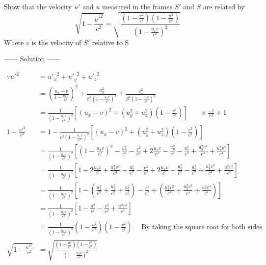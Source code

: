 \begin{example}
    Show that the velocity $u'$ and $u$ measured in the frames $S'$ and $S$ are related by 
\[
\sqrt{1-\frac{{u'}^2}{c^2}} = \sqrt{\frac{\left(1-\frac{v^2}{c^2}\right)\left(1-\frac{u^2}{c^2}\right)}{{\left(1-\frac{u_x v}{c^2}\right)}^2}}
\]
Where $v$ is the velocity of $S'$ relative to S
\begin{center}
    ------ \textcolor{Solution}{Solution} ------
\end{center}
\begin{align*}
    \because {u'}^2         &= {u'_x}^2+{u'_y}^2+{u'_z}^2\\
                            &= {\left(\frac{u_x -v}{1-\frac{u_x v}{c^2}}\right)}^2 + \frac{u_y^2}{\beta^2{\left(1-\frac{u_x v}{c^2}\right)}^2} + \frac{u_z^2}{\beta^2{\left(1-\frac{u_x v}{c^2}\right)}^2}\\
                            &= \frac{1}{{\left(1-\frac{u_x v}{c^2}\right)}^2} \left[ {(u_x - v)}^2 + \left(u_y^2 + u_z^2\right)\left(1-\frac{v^2}{c^2}\right)  \right] \ \ \ \ \ \ \ \ \times\frac{-1}{c^2} + 1\\
1-\frac{{u'}^2}{c^2}        &= 1 - \frac{1}{c^2{\left(1-\frac{u_x v}{c^2}\right)}^2} \left[ {(u_x - v)}^2 + \left(u_y^2 + u_z^2\right)\left(1-\frac{v^2}{c^2}\right)  \right]\\
                            &= \frac{1}{{\left(1-\frac{u_x v}{c^2}\right)}^2} \left[ {\left(1-\frac{u_x v}{c^2}\right)}^2 - \frac{u_x^2}{c^2} - \frac{v^2}{c^2} + 2\frac{u_x v}{c^2} - \frac{u_y^2}{c^2} - \frac{u_z^2}{c^2} + \frac{u_y^2 v^2}{c^4} + \frac{u_z^2 v^2}{c^4}\right]\\
                            &= \frac{1}{{\left(1-\frac{u_x v}{c^2}\right)}^2} \left[ 1 -2\frac{u_x v}{c^2} + \frac{u_x^2 v^2}{c^4} - \frac{u_x^2}{c^2} - \frac{v^2}{c^2} + 2\frac{u_x v}{c^2} - \frac{u_y^2}{c^2} - \frac{u_z^2}{c^2} + \frac{u_y^2 v^2}{c^4} + \frac{u_z^2 v^2}{c^4}\right]\\
                            &= \frac{1}{{\left(1-\frac{u_x v}{c^2}\right)}^2} \left[ 1 -\left(\frac{u_x^2}{c^2} + \frac{u_y^2}{c^2} + \frac{u_z^2}{c^2}\right) - \frac{v^2}{c^2} +\left(\frac{u_x^2 v^2}{c^4} + \frac{u_y^2 v^2}{c^4} + \frac{u_z^2 v^2}{c^4}\right)\right]\\
                            &= \frac{1}{{\left(1-\frac{u_x v}{c^2}\right)}^2} \left[ 1 -\frac{u^2}{c^2} - \frac{v^2}{c^2} +\frac{u^2 v^2}{c^4}\right]\\
                            &= \frac{1}{{\left(1-\frac{u_x v}{c^2}\right)}^2} \left( 1 -\frac{u^2}{c^2}\right) \left(1 - \frac{v^2}{c^2}\right) \ \ \ \ \ \ \text{By taking the square root for both sides}\\
\sqrt{1-\frac{{u'}^2}{c^2}} &= \sqrt{\frac{\left( 1 -\frac{u^2}{c^2}\right) \left(1 - \frac{v^2}{c^2}\right)}{{\left(1-\frac{u_x v}{c^2}\right)}^2}}
\end{align*}
\end{example}

